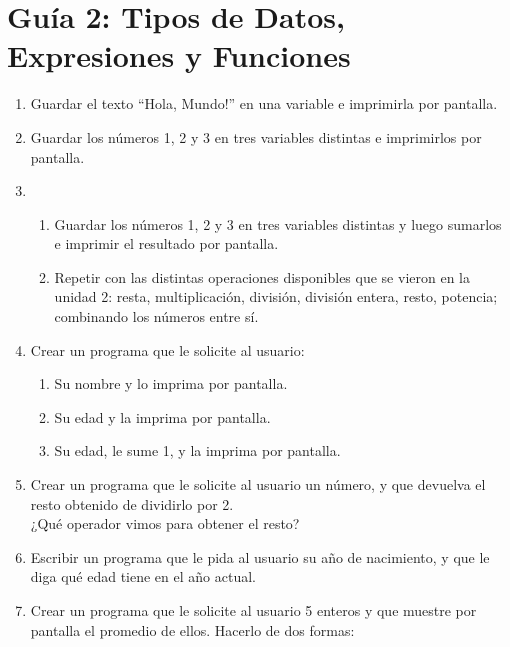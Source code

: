 \documentclass[
  letterpaper,
  DIV=11,
  numbers=noendperiod]{scrreprt}
\providecommand{\tightlist}{%
  \setlength{\itemsep}{0pt}\setlength{\parskip}{0pt}}\usepackage{longtable,booktabs,array}
\begin{document}
\section*{Guía 2: Tipos de Datos, Expresiones y
Funciones}\label{guuxeda-2-tipos-de-datos-expresiones-y-funciones}


\begin{enumerate}
\def\labelenumi{\arabic{enumi}.}
\item
  Guardar el texto ``Hola, Mundo!'' en una variable e imprimirla por
  pantalla.
\item
  Guardar los números 1, 2 y 3 en tres variables distintas e imprimirlos
  por pantalla.
\item
  \begin{enumerate}
  \def\labelenumii{\alph{enumii}.}
  \tightlist
  \item
    Guardar los números 1, 2 y 3 en tres variables distintas y luego
    sumarlos e imprimir el resultado por pantalla.\\
  \item
    Repetir con las distintas operaciones disponibles que se vieron en
    la unidad 2: resta, multiplicación, división, división entera,
    resto, potencia; combinando los números entre sí.
  \end{enumerate}
\item
  Crear un programa que le solicite al usuario:

  \begin{enumerate}
  \def\labelenumii{\alph{enumii}.}
  \tightlist
  \item
    Su nombre y lo imprima por pantalla.
  \item
    Su edad y la imprima por pantalla.
  \item
    Su edad, le sume 1, y la imprima por pantalla.
  \end{enumerate}
\item
  Crear un programa que le solicite al usuario un número, y que devuelva
  el resto obtenido de dividirlo por 2.\\
  ¿Qué operador vimos para obtener el resto?
\item
  Escribir un programa que le pida al usuario su año de nacimiento, y
  que le diga qué edad tiene en el año actual.
\item
  Crear un programa que le solicite al usuario 5 enteros y que muestre
  por pantalla el promedio de ellos. Hacerlo de dos formas:


\end{enumerate}
\end{document}
